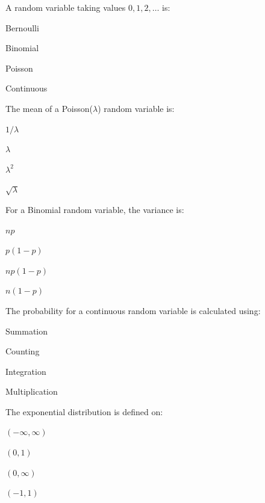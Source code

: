 \documentclass{USTBExam}
\begin{document}
\begin{question}
A random variable taking values $0,1,2,\ldots$ is:
\paren
\begin{choices}
\item Bernoulli
\item Binomial
\item Poisson
\item Continuous
\end{choices}
\end{question}

\begin{question}
The mean of a Poisson($\lambda$) random variable is:
\paren
\begin{choices}
\item $1/\lambda$
\item $\lambda$
\item $\lambda^2$
\item $\sqrt{\lambda}$
\end{choices}
\end{question}

\begin{question}
For a Binomial random variable, the variance is:
\paren
\begin{choices}
\item $np$
\item $p(1-p)$
\item $np(1-p)$
\item $n(1-p)$
\end{choices}
\end{question}

\begin{question}
The probability for a continuous random variable is calculated using:
\paren
\begin{choices}
\item Summation
\item Counting
\item Integration
\item Multiplication
\end{choices}
\end{question}

\begin{question}
The exponential distribution is defined on:
\paren
\begin{choices}
\item $(-\infty,\infty)$
\item $(0,1)$
\item $(0,\infty)$
\item $(-1,1)$
\end{choices}
\end{question}
\end{document}
